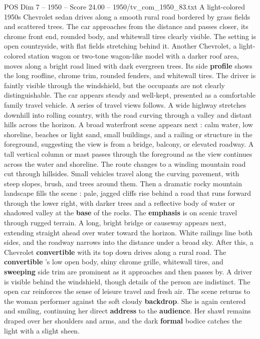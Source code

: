 \begin{textsample}{POS Dim 7 – 1950 – Score 24.00 – 1950/tv\_com\_1950\_83.txt}
A light-colored 1950s Chevrolet sedan drives along a smooth rural road bordered by grass fields and scattered trees.
The car approaches from the distance and passes closer, its chrome front end, rounded body, and whitewall tires clearly visible.
The setting is open countryside, with flat fields stretching behind it.
Another Chevrolet, a light-colored station wagon or two-tone wagon-like model with a darker roof area, moves along a bright road lined with dark evergreen trees.
Its side \textbf{profile} shows the long roofline, chrome trim, rounded fenders, and whitewall tires.
The driver is faintly visible through the windshield, but the occupants are not clearly distinguishable.
The car appears steady and well-kept, presented as a comfortable family travel vehicle.
A series of travel views follows.
A wide highway stretches downhill into rolling country, with the road curving through a valley and distant hills across the horizon.
A broad waterfront scene appears next : calm water, low shoreline, beaches or light sand, small buildings, and a railing or structure in the foreground, suggesting the view is from a bridge, balcony, or elevated roadway.
A tall vertical column or mast passes through the foreground as the view continues across the water and shoreline.
The route changes to a winding mountain road cut through hillsides.
Small vehicles travel along the curving pavement, with steep slopes, brush, and trees around them.
Then a dramatic rocky mountain landscape fills the scene : pale, jagged cliffs rise behind a road that runs forward through the lower right, with darker trees and a reflective body of water or shadowed valley at the \textbf{base} of the rocks.
The \textbf{emphasis} is on scenic travel through rugged terrain.
A long, bright bridge or causeway appears next, extending straight ahead over water toward the horizon.
White railings line both sides, and the roadway narrows into the distance under a broad sky.
After this, a Chevrolet \textbf{convertible} with its top down drives along a rural road.
The \textbf{convertible} ’s low open body, shiny chrome grille, whitewall tires, and \textbf{sweeping} side trim are prominent as it approaches and then passes by.
A driver is visible behind the windshield, though details of the person are indistinct.
The open car reinforces the sense of leisure travel and fresh air.
The scene returns to the woman performer against the soft cloudy \textbf{backdrop}.
She is again centered and smiling, continuing her direct \textbf{address} to the \textbf{audience}.
Her shawl remains draped over her shoulders and arms, and the dark \textbf{formal} bodice catches the light with a slight sheen.

\end{textsample}
